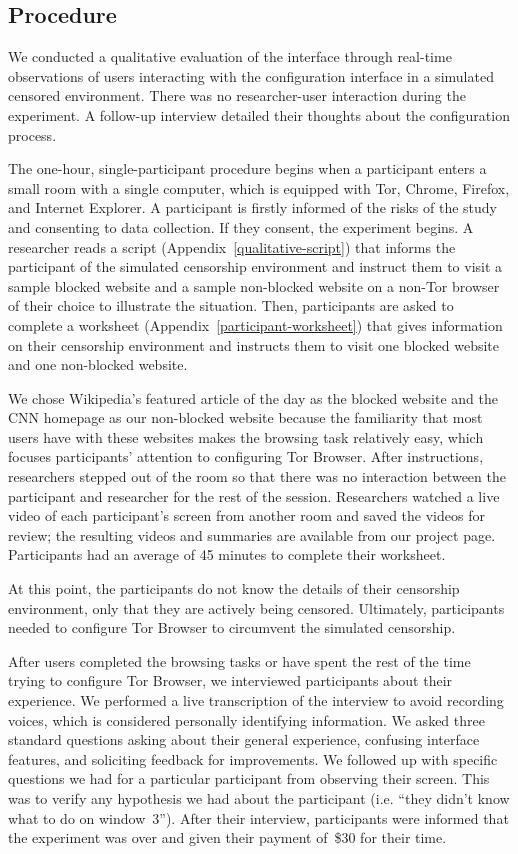 \documentclass[USenglish,oneside,twocolumn]{article}
\begin{document}
\subsection{Procedure}
We conducted a qualitative evaluation of the interface through real-time observations of 
users interacting with the configuration interface in a simulated censored environment.
There was no researcher-user interaction during the experiment. A follow-up interview 
detailed their thoughts about the configuration process.

The one-hour, single-participant procedure begins when a participant enters a small 
room with a single computer, which is equipped with Tor, Chrome, Firefox, and Internet Explorer.
A participant is firstly informed of 
the risks of the study and consenting to data collection. If they consent, the 
experiment begins. A researcher reads a script (Appendix~\ref{qualitative-script}) that 
informs the participant of the simulated censorship environment and
instruct them to visit a sample blocked website and a sample non-blocked website on a
non-Tor browser of their choice to illustrate the situation. Then, participants are asked to 
complete a worksheet (Appendix~\ref{participant-worksheet}) that gives information
on their censorship environment and instructs them
to visit one blocked website and one non-blocked website.
 
We chose Wikipedia's featured article of the day as the blocked website and 
the CNN homepage as our non-blocked website because the familiarity 
that most users have with these websites makes the browsing task relatively easy, 
which focuses participants' attention to configuring Tor Browser. 
After instructions, researchers stepped out of the room so that there was no interaction
between the participant and researcher for the rest of the session.
Researchers watched a live video of each participant's screen from another room
and saved the videos for review; the resulting videos and summaries
are available from our project page.
Participants had an 
average of 45 minutes to complete their worksheet. 

At this point, the participants do not know the details of their censorship environment,
only that they are actively being censored. Ultimately, participants needed to configure Tor Browser to 
circumvent the simulated censorship. 

After users completed the browsing tasks or have spent the rest of the time
trying to configure Tor Browser, we interviewed participants about their experience.
We performed a live transcription of the interview to avoid recording voices, which is
considered personally identifying information. 
We asked three standard questions asking about their general experience, 
confusing interface features, and soliciting feedback for improvements. We followed up
with specific questions we had for a particular participant from observing their screen. 
This was to verify any hypothesis we had about the participant (i.e. ``they didn't know what to do on window~3'').  
After their interview, participants were informed that the experiment was over and 
given their payment of~\$30 for their time. 
\end{document}
